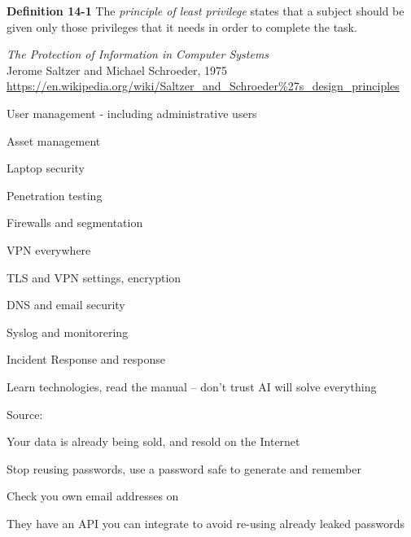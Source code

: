 \documentclass[Screen16to9,17pt]{foils}
\begin{document}

\begin{list2}
\item {\bf Definition 14-1} The \emph{principle of least privilege} states that a subject should be given only those privileges that it needs in order to complete the task.
\item \emph{The Protection of Information in Computer Systems}\\
Jerome Saltzer and Michael Schroeder, 1975\\
\url{https://en.wikipedia.org/wiki/Saltzer_and_Schroeder%27s_design_principles}
\end{list2}



\begin{list2}
\item User management - including administrative users
\item Asset management
\item Laptop security
\item Penetration testing
\item Firewalls and segmentation
\item VPN everywhere
\item TLS and VPN settings, encryption
\item DNS and email security
\item Syslog and monitorering
\item Incident Response and response
\end{list2}

Learn technologies, read the manual -- don't trust AI will solve everything




Source:




\begin{list1}
\item Your data is already being sold, and resold on the Internet
\item Stop reusing passwords, use a password safe to generate and remember
\item Check you own email addresses on 
\item They have an API you can integrate to avoid re-using already leaked passwords\\
{\footnotesize{}}
\end{list1}
\end{document}
